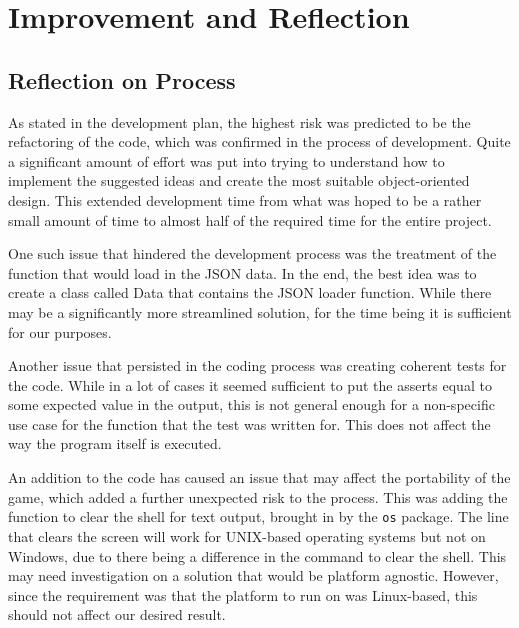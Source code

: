 \documentclass[12pt,a4paper,tightenlines]{article}
\begin{document}
\section{Improvement and Reflection}
\subsection{Reflection on Process}
As stated in the development plan, the highest risk was predicted to be
the refactoring of the code, which was confirmed in the process
of development. Quite a significant amount of effort was put into 
trying to understand how to implement the suggested ideas and create
the most suitable object-oriented design. This extended development time
from what was hoped to be a rather small amount of time to almost
half of the required time for the entire project.

One such issue that hindered
the development process was the treatment of the function that would load
in the JSON data. In the end, the best idea was to create a class called
Data that contains the JSON loader function. While there may be a 
significantly more streamlined solution, for the time being it is
sufficient for our purposes.

Another issue that persisted in the coding process was creating
coherent tests for the code. While in a lot of cases it seemed sufficient
to put the asserts equal to some expected value in the output, this
is not general enough for a non-specific use case for the function
that the test was written for. This does not affect the way the 
program itself is executed.

An addition to the code has caused an issue that may affect the portability of the game,
which added a further unexpected risk to the process. This was adding
the function to clear the shell for text output, brought in by the
\texttt{os} package. The line that clears the screen will work for 
UNIX-based operating systems but not on Windows, due to there being
a difference in the command to clear the shell. This may need 
investigation on a solution that would be platform agnostic. However,
since the requirement was that the platform to run on was Linux-based,
this should not affect our desired result.
\end{document}
